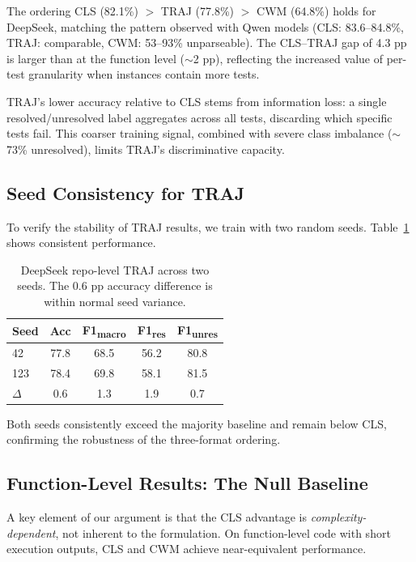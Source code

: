 \documentclass[11pt,a4paper]{article}
\begin{document}
The ordering CLS (82.1\%) $>$ TRAJ (77.8\%) $>$ CWM (64.8\%) holds for DeepSeek, matching the pattern observed with Qwen models (CLS: 83.6--84.8\%, TRAJ: comparable, CWM: 53--93\% unparseable).
The CLS--TRAJ gap of 4.3 pp is larger than at the function level ($\sim$2 pp), reflecting the increased value of per-test granularity when instances contain more tests.

TRAJ's lower accuracy relative to CLS stems from information loss: a single resolved/unresolved label aggregates across all tests, discarding which specific tests fail.
This coarser training signal, combined with severe class imbalance ($\sim$73\% unresolved), limits TRAJ's discriminative capacity.

\subsection{Seed Consistency for TRAJ}
\label{sec:seed}

To verify the stability of TRAJ results, we train with two random seeds.
Table~\ref{tab:traj-seeds} shows consistent performance.

\begin{table}[t]
\centering
\small
\begin{tabular}{lcccc}
\toprule
\textbf{Seed} & \textbf{Acc} & \textbf{F1\textsubscript{macro}} & \textbf{F1\textsubscript{res}} & \textbf{F1\textsubscript{unres}} \\
\midrule
42 & 77.8 & 68.5 & 56.2 & 80.8 \\
123 & 78.4 & 69.8 & 58.1 & 81.5 \\
\midrule
$\Delta$ & 0.6 & 1.3 & 1.9 & 0.7 \\
\bottomrule
\end{tabular}
\caption{DeepSeek repo-level TRAJ across two seeds. The 0.6 pp accuracy difference is within normal seed variance.}
\label{tab:traj-seeds}
\end{table}

Both seeds consistently exceed the majority baseline and remain below CLS, confirming the robustness of the three-format ordering.

\subsection{Function-Level Results: The Null Baseline}
\label{sec:func-level}

A key element of our argument is that the CLS advantage is \emph{complexity-dependent}, not inherent to the formulation.
On function-level code with short execution outputs, CLS and CWM achieve near-equivalent performance.
\end{document}
